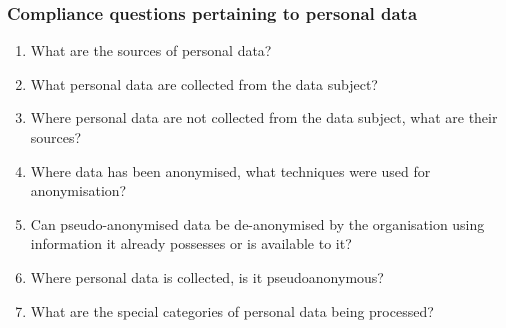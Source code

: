 \subsubsection{Compliance questions pertaining to personal data}
\begin{enumerate}[label={\textit{CMQ.\theenumi}},resume]
    \item What are the sources of personal data?
    \item What personal data are collected from the data subject?
    \item Where personal data are not collected from the data subject, what are their sources?
    \item Where data has been anonymised, what techniques were used for anonymisation?
    \item Can pseudo-anonymised data be de-anonymised by the organisation using information it already possesses or is available to it?
    \item Where personal data is collected, is it pseudoanonymous?
    \item What are the special categories of personal data being processed?
\end{enumerate}

